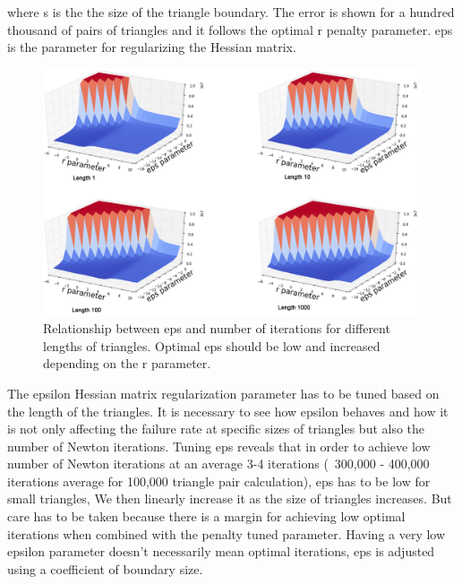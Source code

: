 \documentclass[times,12pt]{ACME2015article}
\begin{document}
where s is the the size of the triangle boundary. The error is shown for a hundred thousand of pairs of triangles and it follows the optimal r penalty parameter. eps is the parameter for regularizing the Hessian matrix.


\begin{figure}[!h]
\centerline{\includegraphics[width=1\textwidth]{figure_2.png}} \protect\caption{\label{fig15}Relationship between eps and number of iterations for different lengths of triangles. Optimal eps should be low and increased depending on the r parameter.}
\end{figure} 

The epsilon Hessian matrix regularization parameter has to be tuned based on the length of the triangles. It is necessary to see how epsilon behaves and how it is not only affecting the failure rate at specific sizes of triangles but also the number of Newton iterations. Tuning eps reveals that in order to achieve low number of Newton iterations at an average 3-4 iterations (~300,000 - 400,000 iterations average for 100,000 triangle pair calculation), eps has to be low for small triangles, We then linearly increase it as the size of triangles increases. But care has to be taken because there is a margin for achieving low optimal iterations when combined with the penalty tuned parameter. Having a very low epsilon parameter doesn't necessarily mean optimal iterations, eps is adjusted using a coefficient of boundary size.
\end{document}
